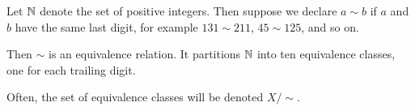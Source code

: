 \begin{example}
	Let $\mathbb N$ denote the set of positive integers.
	Then suppose we declare $a \sim b$ if $a$ and $b$ have the same last digit,
	for example $131 \sim 211$, $45 \sim 125$, and so on.

	Then $\sim$ is an equivalence relation.
	It partitions $\mathbb N$ into ten equivalence classes,
	one for each trailing digit.
\end{example}

Often, the set of equivalence classes will be denoted $X/{\sim}$.
